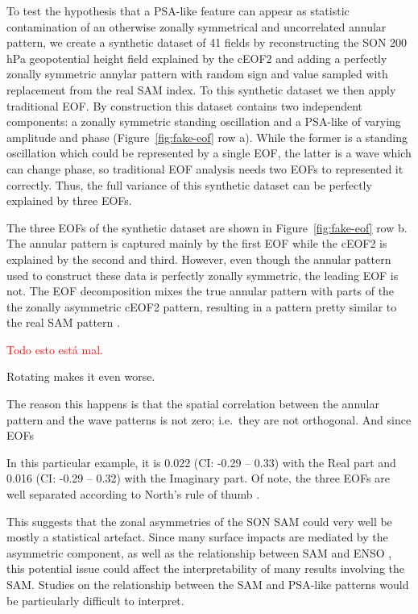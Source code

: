 \documentclass[smallextended]{svjour3}       %
\begin{document}
To test the hypothesis that a PSA-like feature can appear as statistic contamination of an otherwise zonally symmetrical and uncorrelated annular pattern, we create a synthetic dataset of 41 fields by reconstructing the SON 200 hPa geopotential height field explained by the cEOF2 and adding a perfectly zonally symmetric annylar pattern with random sign and value sampled with replacement from the real SAM index.
To this synthetic dataset we then apply traditional EOF.
By construction this dataset contains two independent components: a zonally symmetric standing oscillation and a PSA-like of varying amplitude and phase (Figure~\ref{fig:fake-eof} row a).
While the former is a standing oscillation which could be represented by a single EOF, the latter is a wave which can change phase, so traditional EOF analysis needs two EOFs to represented it correctly.
Thus, the full variance of this synthetic dataset can be perfectly explained by three EOFs.

The three EOFs of the synthetic dataset are shown in Figure~\ref{fig:fake-eof} row b.
The annular pattern is captured mainly by the first EOF while the cEOF2 is explained by the second and third.
However, even though the annular pattern used to construct these data is perfectly zonally symmetric, the leading EOF is not.
The EOF decomposition mixes the true annular pattern with parts of the the zonally asymmetric cEOF2 pattern, resulting in a pattern pretty similar to the real SAM pattern \citep{fogt2020}.

\textcolor{red}{Todo esto está mal.}

Rotating makes it even worse.

The reason this happens is that the spatial correlation between the annular pattern and the wave patterns is not zero; i.e.~they are not orthogonal. And since EOFs

In this particular example, it is 0.022 (CI: -0.29 -- 0.33) with the Real part and 0.016 (CI: -0.29 -- 0.32) with the Imaginary part.
Of note, the three EOFs are well separated according to North's rule of thumb \citep{north1982}.

This suggests that the zonal asymmetries of the SON SAM could very well be mostly a statistical artefact.
Since many surface impacts are mediated by the asymmetric component, as well as the relationship between SAM and ENSO \citep{campitelli2021}, this potential issue could affect the interpretability of many results involving the SAM.
Studies on the relationship between the SAM and PSA-like patterns would be particularly difficult to interpret.
\end{document}
